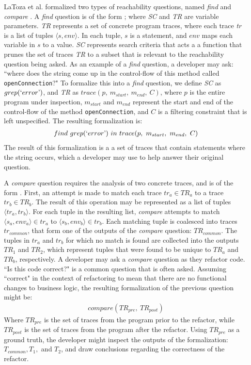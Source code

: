 \noindent LaToza et al. formalized two types of reachability questions, named
\textit{find} and \textit{compare} \cite{latoza-2010-reach}.
A \textit{find} question is of the form \findq{}; where \textit{SC} and
\textit{TR} are variable parameters.
\textit{TR} represents a set of concrete program traces, where each trace 
\textit{tr} is a list of tuples $\langle s, env \rangle$. 
In each tuple, $s$ is a statement, and $env$ maps each variable in $s$ to a
value.
\textit{SC} represents search criteria that acts a a function that prunes the
set of traces \textit{TR} to a subset that is relevant to the reachability
question being asked.
As an example of a \textit{find} question, a developer may ask: ``where does
the string  come up in the control-flow of this method called 
\texttt{openConnection}?"
To formalize this into a \textit{find} question, we define \textit{SC} as
$grep(`error\textrm')$, and \textit{TR} as 
$trace(p, \ m_{start}, \ m_{end}, \ C)$, where $p$ is the entire program under
inspection, $m_{start}$ and $m_{end}$ represent the start and end of the
control-flow of the method \texttt{openConnection}, and $C$ is a filtering
constraint that is left unspecified.
The resulting formalization is:
\begin{align*}
  find \ grep(`error\textrm') \ in \ trace(p, \ m_{start}, \ m_{end}, \ C)
\end{align*}
The result of this formalization is a a set of traces that contain statements
where the string  occurs, which a developer may use to help answer
their original question.

\par A \textit{compare} question requires the analysis of two concrete traces, 
and is of the form \compareq{}. 
First, an attempt is made to match each trace $tr_a \in TR_a$ to a trace 
$tr_b \in TR_b$.
The result of this operation may be represented as a list of tuples 
$\langle tr_a, tr_b \rangle$.
For each tuple in the resulting list, \textit{compare} attempts to match 
$\langle s_a, env_a\rangle \in tr_a$ to $\langle s_b, env_b \rangle \in tr_b$.
Each matching tuple is coalesced into traces $tr_{common}$, that form one
of the outputs of the \textit{compare} question: $TR_{common}$.
The tuples in $tr_a$ and $tr_b$ for which no match is found are collected into
the outputs $TR_1$ and $TR_2$, which represent tuples that were found to be 
unique to $TR_a$ and $TR_b$, respectively.
A developer may ask a \textit{compare} question as they refactor code.
``Is this code correct?" \cite{latoza-2010-hard-questions} is a common
question that is often asked.
Assuming ``correct" in the context of refactoring to mean that there are no
functional changes to business logic, the resulting formalization of the
previous question might be:
\begin{align*}
  compare(TR_{pre}, \ TR_{post})
\end{align*}
Where $TR_{pre}$ is the set of traces from the program prior to the refactor,
while $TR_{post}$ is the set of traces from the program after the refactor.
Using $TR_{pre}$ as a ground truth, the developer might inspect the outputs
of the formalization: $T_{common}, T_1,$ and $T_2$, and draw conclusions
regarding the correctness of the refactor.

